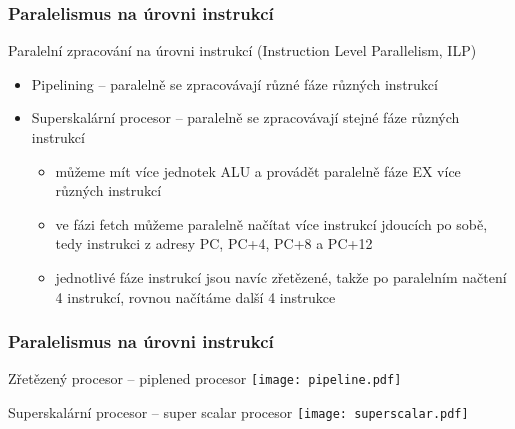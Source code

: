 \documentclass{beamer}
\begin{document}
\begin{frame}
\frametitle{Paralelismus na úrovni instrukcí}

Paralelní zpracování na úrovni instrukcí (Instruction Level Parallelism, ILP)
\begin{itemize}
 \item Pipelining -- paralelně se zpracovávají různé fáze různých instrukcí
 \item Superskalární procesor -- paralelně se zpracovávají stejné fáze různých instrukcí
\begin{itemize}
\item můžeme mít více jednotek ALU a provádět paralelně fáze EX více různých instrukcí
\item ve fázi fetch můžeme paralelně načítat více instrukcí jdoucích po sobě, tedy instrukci z adresy PC, PC+4, PC+8 a PC+12
\item jednotlivé fáze instrukcí jsou navíc zřetězené, takže po paralelním načtení 4 instrukcí, rovnou načítáme další 4 instrukce 
\end{itemize}
\end{itemize}

\end{frame}

\begin{frame}
\frametitle{Paralelismus na úrovni instrukcí}

Zřetězený procesor -- piplened procesor
\texttt{[image: pipeline.pdf]}

Superskalární procesor -- super scalar procesor
\texttt{[image: superscalar.pdf]}

\end{frame}
\end{document}
